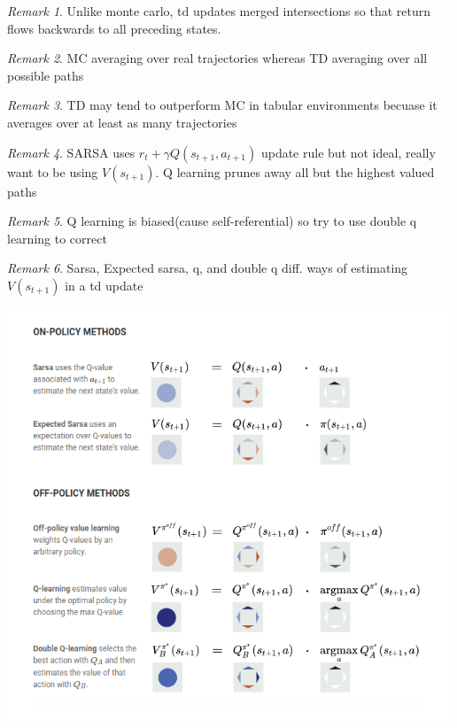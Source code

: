 \documentclass[11pt]{article}
\theoremstyle{remark}
\newtheorem{remark}{Remark}
\begin{document}
\begin{remark}
	Unlike monte carlo, td updates merged intersections so that return flows backwards to all preceding states.
\end{remark}

\begin{remark}
	MC averaging over real trajectories whereas TD averaging over all possible paths
\end{remark}

\begin{remark}
	TD may tend to outperform MC in tabular environments becuase it averages over at least as many trajectories
\end{remark}

\begin{remark}
	SARSA uses $r_t + \gamma Q(s_{t+1},a_{t+1})$ update rule but not ideal, really want to be using $V(s_{t+1})$. Q learning prunes away all but the highest valued paths
\end{remark}

\begin{remark}
	Q learning is biased(cause self-referential) so try to use double q learning to correct
\end{remark}

\begin{remark}
	Sarsa, Expected sarsa, q, and double q diff. ways of estimating $V(s_{t+1})$ in a td update
\end{remark}

\includegraphics[width=500px]{../pics/td_methods.png}
	
\end{document}
